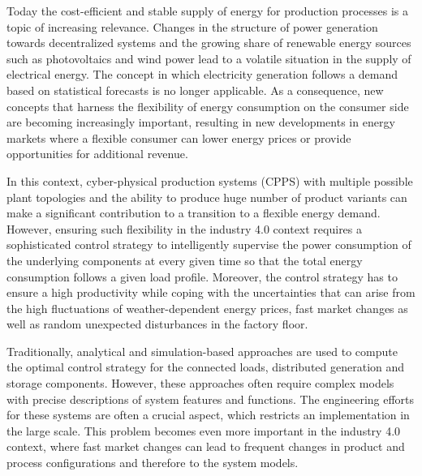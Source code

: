 
Today the cost-efficient and stable supply of energy for production processes is a topic of increasing relevance. Changes in the structure of power generation towards decentralized systems and the growing share of renewable energy sources such as photovoltaics and wind power lead to a volatile situation in the supply of electrical energy. The concept in which electricity generation follows a demand based on statistical forecasts is no longer applicable. As a consequence, new concepts that harness the flexibility of energy consumption on the consumer side are becoming increasingly important, resulting in new developments in energy markets where a flexible consumer can lower energy prices or provide opportunities for additional revenue.

In this context, cyber-physical production systems (CPPS) with multiple possible plant topologies and the ability to produce huge number of product variants can make a significant contribution to a transition to a flexible energy demand. However, ensuring such flexibility in the industry 4.0 context requires a sophisticated control strategy to intelligently supervise the power consumption of the underlying components at every given time so that the total energy consumption follows a given load profile. Moreover, the control strategy has to ensure a high productivity while coping with the uncertainties that can arise from the high fluctuations of weather-dependent energy prices, fast market changes as well as random unexpected disturbances in the factory floor.

Traditionally, analytical and simulation-based approaches are used to compute the optimal control strategy for the connected loads, distributed generation and storage components. However, these approaches often require complex models with precise descriptions of system features and functions. The engineering efforts for these systems are often a crucial aspect, which restricts an implementation in the large scale. This problem becomes even more important in the industry 4.0 context, where fast market changes can lead to frequent changes in product and process configurations and therefore to the system models.

